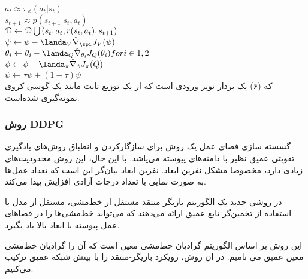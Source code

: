 $a_t \approx \pi_\phi(a_t|s_t)$ \\
$s_{t+1} \approx p(s_{t+1}|s_t,a_t)$\\
$\EuScript{D}\leftarrow \EuScript{D} \bigcup {(s_t,a_t,r(s_t,a_t),s_{t+1})}$ \\
$\psi \leftarrow \psi - \landa_V \hat{\nabla}_\spi J_V (\psi)$ \\
$\theta_i \leftarrow \theta_i - \landa_Q \hat{\nabla}_{\theta_i} J_Q(\theta_i) for i \in {1,2}$\\
$\phi \leftarrow \phi - \landa_\pi \hat{\nabla}_\phi J_\pi (Q)$ \\
$\bar{\psi} \leftarrow \tau \psi + (1-\tau) \psi$\\
که (۶) یک بردار نویز ورودی است که از یک توزیع ثابت مانند یک گوسی کروی نمونه‌گیری شده‌است.
\subsubsection{روش DDPG}
گسسته سازی فضای عمل یک روش برای سازگار‌کردن و انطباق روش‌های یادگیری تقویتی عمیق نظیر 
با دامنه‌های پیوسته می‌یاشد. با این حال، این روش محدودیت‌های زیادی دارد، مخصوصا مشکل نفرین ابعاد.  نفرین ابعاد بیان‌گر این است که تعداد عمل‌ها به صورت نمایی با تعداد درجات آزادی افزایش پیدا می‌کند. 

در روشی جدید یک الگوریتم بازیگر-منتقد مستقل از خط‌مشی، مستقل از مدل
با استفاده از تخمین‌گر تابع عمیق ارائه می‌دهند که می‌تواند خط‌مشی‌ها را در فضاهای عمل پیوسته با ابعاد بالا یاد بگیرد.

این روش بر اساس الگوریتم گرادیان خط‌مشی معین
است که آن را
گرادیان خط‌مشی معین عمیق
می نامیم. 
در ان روش، رویکرد بازیگر-منتقد را با بینش شبکه  عمیق
ترکیب می‌کنیم.


